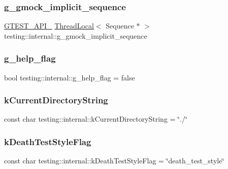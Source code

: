 \subsubsection{\texorpdfstring{g\_gmock\_implicit\_sequence}{g\_gmock\_implicit\_sequence}}
{\footnotesize\ttfamily \mbox{\hyperlink{_obj__test_2lib_2googletest-release-1_88_81_2googletest_2include_2gtest_2internal_2gtest-port_8h_aa73be6f0ba4a7456180a94904ce17790}{G\+T\+E\+S\+T\+\_\+\+A\+P\+I\+\_\+}} \mbox{\hyperlink{classtesting_1_1internal_1_1_thread_local}{Thread\+Local}}$<$ Sequence $\ast$ $>$ testing\+::internal\+::g\+\_\+gmock\+\_\+implicit\+\_\+sequence}

\mbox{\label{namespacetesting_1_1internal_a93a772f5e51973b105d91cbb66a203f4}} 
\subsubsection{\texorpdfstring{g\_help\_flag}{g\_help\_flag}}
{\footnotesize\ttfamily bool testing\+::internal\+::g\+\_\+help\+\_\+flag = false}

\mbox{\label{namespacetesting_1_1internal_af0c1ffec2a97f6094e956d46c07f0b5d}} 
\subsubsection{\texorpdfstring{kCurrentDirectoryString}{kCurrentDirectoryString}}
{\footnotesize\ttfamily const char testing\+::internal\+::k\+Current\+Directory\+String = \char`\"{}./\char`\"{}}

\mbox{\label{namespacetesting_1_1internal_a8be730bac57cfd5a92d4aeea57ad499e}} 
\subsubsection{\texorpdfstring{kDeathTestStyleFlag}{kDeathTestStyleFlag}}
{\footnotesize\ttfamily const char testing\+::internal\+::k\+Death\+Test\+Style\+Flag = \char`\"{}death\+\_\+test\+\_\+style\char`\"{}}

